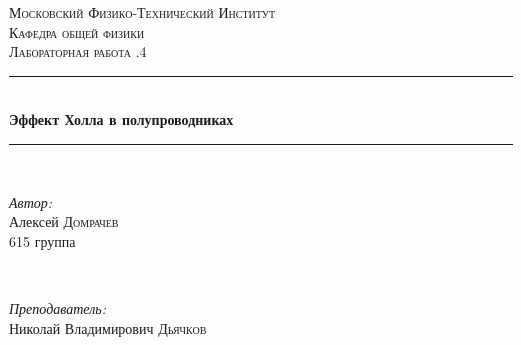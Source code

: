 \documentclass[a4paper, 12pt]{article}
\begin{document}
\begin{titlepage}

\newcommand{\HRule}{\rule{\linewidth}{0.5mm}} %

\center %
 

\textsc{\LARGE Московский Физико-Технический Институт}\\[1,5cm] %
\textsc{\Large Кафедра общей физики}\\[0.5cm] %
\textsc{\large Лабораторная работа .4}\\[0.5cm] %


\HRule
\\[0.4cm]
{ \huge \bfseries Эффект Холла в полупроводниках}
\\[0.2cm] %
\HRule
\\[1.5cm]


 

\begin{minipage}{0.4\textwidth}
	\begin{flushleft} \large
		\emph{Автор:}\\
		Алексей \textsc{Домрачев} \\
		615 группа
	\end{flushleft}
\end{minipage}
~
\begin{minipage}{0.4\textwidth}
	\begin{flushright} \large
		\emph{Преподаватель:} \\
		Николай Владимирович \textsc{Дьячков} %
	\end{flushright}
\end{minipage}


\end{titlepage}
\end{document}
